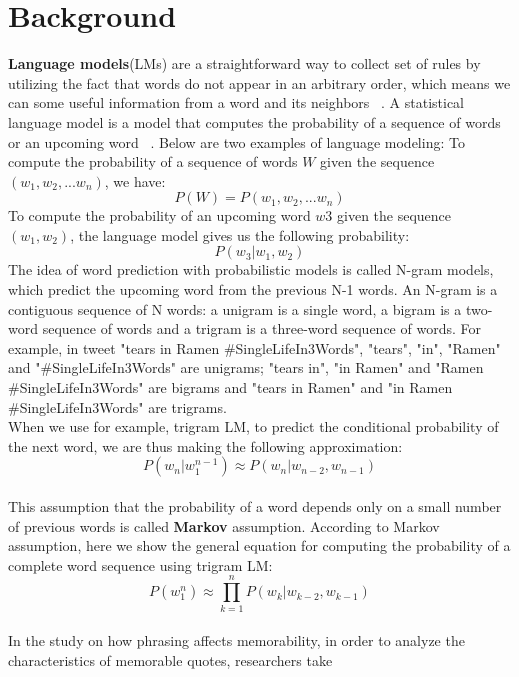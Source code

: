 \documentclass[11pt,a4paper]{article}
\begin{document}
\section{Background}
\textbf{Language models}(LMs) are a straightforward way to collect set of rules by utilizing the fact that words do not appear in an arbitrary order, which means we can some useful information from a word and its neighbors ~\cite{de2011natural}. A statistical language model is a model that computes the probability of a sequence of words or an upcoming word ~\cite{JM}. Below are two examples of language modeling:
To compute the probability of a sequence of words $W$ given the sequence $(w_{1},w_{2},...w_{n})$, we have:
\begin{equation}
P(W) = P(w_{1},w_{2},...w_{n})
\end{equation}
To compute the probability of an upcoming word $w3$ given the sequence $(w_{1},w_{2})$, the language model gives us the following probability:
\begin{equation}
P(w_{3}|w_{1},w_{2})
\end{equation}
The idea of word prediction with probabilistic models is called N-gram models, which predict the upcoming word from the previous N-1 words. An N-gram is a contiguous sequence of N words: a unigram is a single word, a bigram is a two-word sequence of words and a trigram is a three-word sequence of words. For example, in tweet "tears in Ramen \#SingleLifeIn3Words", "tears", "in", "Ramen" and "\#SingleLifeIn3Words" are unigrams; "tears in", "in Ramen" and "Ramen \#SingleLifeIn3Words" are bigrams and "tears in Ramen" and "in Ramen \#SingleLifeIn3Words" are trigrams.\\
When we use for example, trigram LM, to predict the conditional probability of the next word, we are thus making the following approximation:
\begin{equation}
P(w_n|w_1^{n-1})\approx P(w_n|w_{n-2}, w_{n-1})
\end{equation}\\
This assumption that the probability of a word depends only on a small number of previous words is called \textbf{Markov} assumption. According to Markov assumption, here we show the general equation for computing the probability of a complete word sequence using trigram LM:
\begin{equation}
P(w_1^n)\approx \prod_{k=1}^{n} P(w_k|w_{k-2}, w_{k-1})
\end{equation}\\
In the study on how phrasing affects memorability, in order to analyze the characteristics of memorable quotes, researchers take
\end{document}
